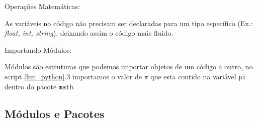             Operações Matemáticas:
            
            As variáveis no código não precisam ser declaradas para um 
            tipo específico (Ex.: \textit{float, int, string}), deixando assim o código mais fluido. 
            \begin{quote}
            
                                                       
            \end{quote}
            
            Importando Módulos:
            
            Módulos são estruturas que podemos importar objetos de um código a outro,
            no script \ref{lim_python}.3 importamos o valor de $\pi$ que esta contido na variável \verb|pi| dentro do pacote \verb|math|. 
            
            \begin{quote}
                                                        
            \end{quote}
            
        \subsection{Módulos e Pacotes}
            
